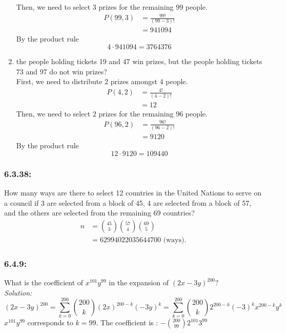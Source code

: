 \documentclass[a4paper]{article}
\begin{document}
\begin{enumerate}[label = \textbf{\alph*)}]
	      Then, we need to select 3 prizes for the remaining 99 people.
	      \begin{align*}
		      P(99,3) & = \frac{99!}{(99-3)!} \\
		              & = 941094
	      \end{align*}
	      By the product rule
	      \begin{equation*}
		      4 \cdot 941094 = 3764376	
	      \end{equation*}
	\item the people holding tickets 19 and 47 win prizes, but the people holding tickets 73 and 97 do not win prizes? \\
	      First, we need to distribute 2 prizes amongst 4 people.
	      \begin{align*}
		      P(4,2) & = \frac{4!}{(4-2)!} \\
		             & = 12
	      \end{align*}
	      Then, we need to select 2 prizes for the remaining 96 people.
	      \begin{align*}
		      P(96,2) & = \frac{96!}{(96-2)!} \\
		              & = 9120
	      \end{align*}
	      By the product rule
	      \begin{equation*}
		      12 \cdot 9120 = 109440
	      \end{equation*}
\end{enumerate}

\subsubsection*{6.3.38:}
How many ways are there to select 12 countries in the United Nations to serve on a council if 3 are selected from a block of 45, 4 are selected from a block of 57, and the others are selected from the remaining 69 countries?
\begin{align*}
	n & =  {45 \choose 3}{57 \choose 4}{69 \choose 5} \\
	  & =  62994022035644700 \text{ (ways).}
\end{align*}

\subsubsection*{6.4.9:}
What is the coefficient of $x^{101}y^{99}$ in the expansion of $(2x - 3y)^{200} ?$\\
\emph{Solution:}
\begin{equation*}
	(2x - 3y)^{200} = \sum_{k=0}^{200} {200 \choose k}(2x)^{200-k}(-3y)^{k} = \sum_{k=0}^{200} {200 \choose k} 2^{200-k}(-3)^{k} x^{200 -k}y^{k}
\end{equation*}
$x^{101}y^{99}$ corresponds to $k=99$. The coefficient is : $-{200 \choose 99}2^{101}3^{99}$
\end{document}
